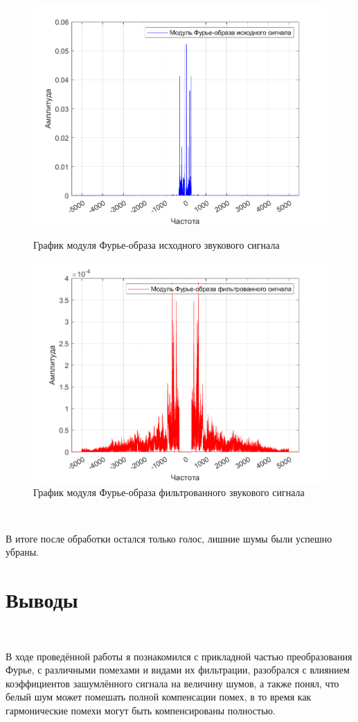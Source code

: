 \documentclass[a4paper]{article}
\begin{document}
\begin{figure}[H]
    \begin{minipage}{0.5\textwidth}
        \centering
        \includegraphics[width=\textwidth]{ex2/snd_original_Fourier.png}
        \caption{График модуля Фурье-образа исходного звукового сигнала}
    \end{minipage}    
    \begin{minipage}{0.5\textwidth}
        \centering
        \includegraphics[width=\textwidth]{ex2/snd_filtered_Fourier.png}
        \caption{График модуля Фурье-образа фильтрованного звукового сигнала}
    \end{minipage}
\end{figure}\

В итоге после обработки остался только голос, лишние шумы были успешно убраны. 

\section{Выводы}\

В ходе проведённой работы я познакомился с прикладной частью преобразования Фурье, с различными помехами и видами их фильтрации, разобрался с влиянием коэффициентов зашумлённого сигнала на величину шумов, а также понял, что белый шум может помешать полной компенсации помех, в то время как гармонические помехи могут быть компенсированы полностью.
\end{document}
